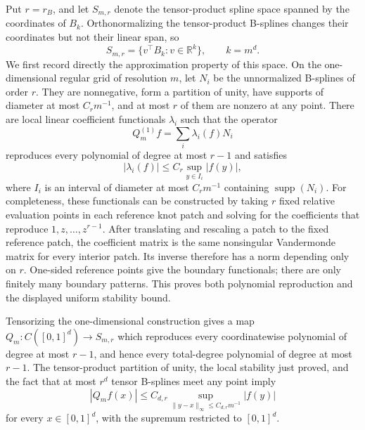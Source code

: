 Put \(r=r_B\), and let \(S_{m,r}\) denote the tensor-product spline space spanned by the coordinates of \(B_k\). Orthonormalizing the tensor-product B-splines changes their coordinates but not their linear span, so
\[
S_{m,r}=\{v^\top B_k:v\in\mathbb R^k\},\qquad k=m^d.
\]
We first record directly the approximation property of this space. On the one-dimensional regular grid of resolution \(m\), let \(N_i\) be the unnormalized B-splines of order \(r\). They are nonnegative, form a partition of unity, have supports of diameter at most \(C_r m^{-1}\), and at most \(r\) of them are nonzero at any point. There are local linear coefficient functionals \(\lambda_i\) such that the operator
\[
Q_m^{(1)}f=\sum_i\lambda_i(f)N_i
\]
reproduces every polynomial of degree at most \(r-1\) and satisfies
\[
|\lambda_i(f)|\le C_r\sup_{y\in I_i}|f(y)|,
\]
where \(I_i\) is an interval of diameter at most \(C_r m^{-1}\) containing \(\operatorname{supp}(N_i)\). For completeness, these functionals can be constructed by taking \(r\) fixed relative evaluation points in each reference knot patch and solving for the coefficients that reproduce \(1,z,\ldots,z^{r-1}\). After translating and rescaling a patch to the fixed reference patch, the coefficient matrix is the same nonsingular Vandermonde matrix for every interior patch. Its inverse therefore has a norm depending only on \(r\). One-sided reference points give the boundary functionals; there are only finitely many boundary patterns. This proves both polynomial reproduction and the displayed uniform stability bound.

Tensorizing the one-dimensional construction gives a map \(Q_m:C([0,1]^d)\to S_{m,r}\) which reproduces every coordinatewise polynomial of degree at most \(r-1\), and hence every total-degree polynomial of degree at most \(r-1\). The tensor-product partition of unity, the local stability just proved, and the fact that at most \(r^d\) tensor B-splines meet any point imply
\[
|Q_m f(x)|\le C_{d,r}\sup_{\|y-x\|_\infty\le C_{d,r}m^{-1}}|f(y)|
\tag{1}
\]
for every \(x\in[0,1]^d\), with the supremum restricted to \([0,1]^d\).

